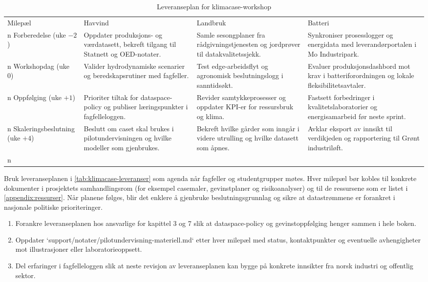 \begin{table}[h]
    \centering
    \caption{Leveranseplan for klimacase-workshop}
    \label{tab:klimacase-leveranser}
    \begin{tabular}{p{3.0cm}p{3.2cm}p{3.2cm}p{3.2cm}}
        \toprule
        Milepæl & Havvind & Landbruk & Batteri \\n        \midrule
        Forberedelse (uke $-2$) & Oppdater produksjons- og værdatasett, bekreft tilgang til Statnett og OED-notater. & Samle sesongplaner fra rådgivningstjenesten og jordprøver til datakvalitetssjekk. & Synkroniser prosesslogger og energidata med leverandørportalen i Mo Industripark. \\n        Workshopdag (uke 0) & Valider hydrodynamiske scenarier og beredskapsrutiner med fagfeller. & Test edge-arbeidsflyt og agronomisk beslutningslogg i sanntidsøkt. & Evaluer produksjonsdashbord mot krav i batteriforordningen og lokale fleksibilitetsavtaler. \\n        Oppfølging (uke $+1$) & Prioriter tiltak for dataspace-policy og publiser læringspunkter i fagfelleloggen. & Revider samtykkeprosesser og oppdater KPI-er for ressursbruk og klima. & Fastsett forbedringer i kvalitetslaboratorier og energisamarbeid før neste sprint. \\n        Skaleringsbeslutning (uke $+4$) & Beslutt om caset skal brukes i pilotundervisningen og hvilke modeller som gjenbrukes. & Bekreft hvilke gårder som inngår i videre utrulling og hvilke datasett som åpnes. & Avklar eksport av innsikt til verdikjeden og rapportering til Grønt industriløft. \\n        \bottomrule
    \end{tabular}
\end{table}

Bruk leveranseplanen i \autoref{tab:klimacase-leveranser} som agenda når fagfeller og studentgrupper møtes. Hver milepæl bør kobles til konkrete dokumenter i prosjektets samhandlingsrom (for eksempel casemaler, gevinstplaner og risikoanalyser) og til de ressursene som er listet i \autoref{appendix:ressurser}. Når planene følges, blir det enklere å gjenbruke beslutningsgrunnlag og sikre at datastrømmene er forankret i nasjonale politiske prioriteringer.

\begin{enumerate}
    \item Forankre leveranseplanen hos ansvarlige for kapittel 3 og 7 slik at dataspace-policy og gevinstoppfølging henger sammen i hele boken.
    \item Oppdater `support/notater/pilotundervisning-materiell.md` etter hver milepæl med status, kontaktpunkter og eventuelle avhengigheter mot illustrasjoner eller laboratorieoppsett.
    \item Del erfaringer i fagfelleloggen slik at neste revisjon av leveranseplanen kan bygge på konkrete innsikter fra norsk industri og offentlig sektor.
\end{enumerate}

